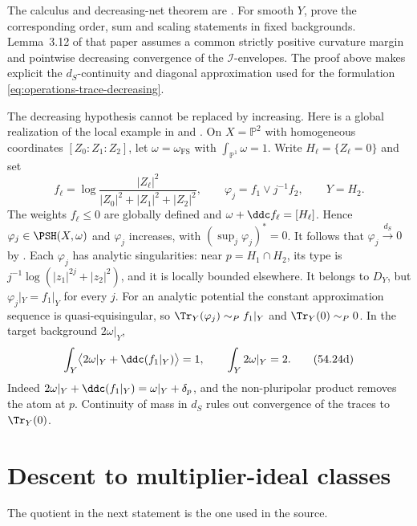 The calculus and decreasing-net theorem are
\cite[Propositions~8.2.1--8.2.2]{XiaBook}.
For smooth $Y$, \cite[Lemmas~3.9--3.10]{DXTraceV2} prove the
corresponding order, sum and scaling statements in fixed backgrounds.
Lemma~3.12 of that paper assumes a common strictly positive
curvature margin and pointwise decreasing convergence of the
$\mathcal I$-envelopes.  The proof above makes explicit the
$d_S$-continuity and diagonal approximation used for the formulation
\eqref{eq:operations-trace-decreasing}.

\begin{remark}
\label{rem:operations-trace-not-increasing}
The decreasing hypothesis cannot be replaced by increasing.
Here is a global realization of the local example in
\cite[Example~3.13]{DXTraceV2} and
\cite[Example~8.2.1]{XiaBook}.
On $X=\mathbb P^2$ with homogeneous coordinates $[Z_0:Z_1:Z_2]$,
let $\omega=\omega_{\mathrm{FS}}$ with $\int_{\mathbb P^1}\omega=1$.
Write $H_\ell=\{Z_\ell=0\}$ and set
\[
 f_\ell=\log\frac{|Z_\ell|^2}
 {|Z_0|^2+|Z_1|^2+|Z_2|^2},\qquad
 \varphi_j=f_1\vee j^{-1}f_2,\qquad Y=H_2.
\tag{54.24c}\label{eq:operations-trace-increasing-example}
\]
The weights $f_\ell\leq0$ are globally defined and
$\omega+\ddc f_\ell=[H_\ell]$.
Hence $\varphi_j\in\PSH(X,\omega)$ and
$\varphi_j$ increases, with $(\sup_j\varphi_j)^*=0$.
It follows that $\varphi_j\xrightarrow{d_S}0$ by
\cite[Corollary~6.2.4]{XiaBook}.
Each $\varphi_j$ has analytic singularities: near
$p=H_1\cap H_2$, its type is
$j^{-1}\log(|z_1|^{2j}+|z_2|^2)$, and it is locally bounded elsewhere.
It belongs to $D_Y$, but $\varphi_j|_Y=f_1|_Y$ for every $j$.
For an analytic potential the constant approximation sequence is
quasi-equisingular, so
$\Tr_Y(\varphi_j)\sim_P f_1|_Y$ and $\Tr_Y(0)\sim_P0$.
In the target background $2\omega|_Y$,
\[
 \int_Y\bigl\langle2\omega|_Y+\ddc(f_1|_Y)\bigr\rangle=1,
 \qquad
 \int_Y2\omega|_Y=2.
\tag{54.24d}\label{eq:operations-trace-increasing-mass-gap}
\]
Indeed $2\omega|_Y+\ddc(f_1|_Y)=\omega|_Y+\delta_p$,
and the non-pluripolar product removes the atom at $p$.
Continuity of mass in $d_S$ rules out convergence of the traces to
$\Tr_Y(0)$.
\end{remark}


\section{Descent to multiplier-ideal classes}
\label{sec:operations-trace-descent}

The quotient in the next statement is the one used in the source.

